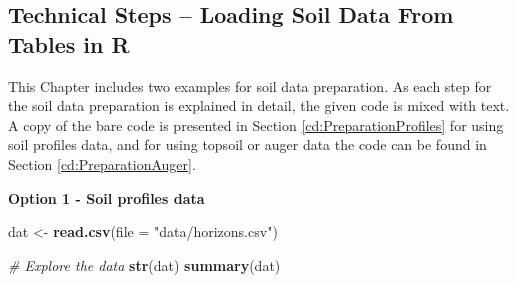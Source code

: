 \documentclass[10pt,b5paper,]{book}
\newenvironment{Shaded}{\begin{snugshade}}{\end{snugshade}}
\newcommand{\CommentTok}[1]{\textcolor[rgb]{0.56,0.35,0.01}{\textit{#1}}}
\newcommand{\DataTypeTok}[1]{\textcolor[rgb]{0.13,0.29,0.53}{#1}}
\newcommand{\KeywordTok}[1]{\textcolor[rgb]{0.13,0.29,0.53}{\textbf{#1}}}
\newcommand{\NormalTok}[1]{#1}
\newcommand{\StringTok}[1]{\textcolor[rgb]{0.31,0.60,0.02}{#1}}
\theoremstyle{definition}
\theoremstyle{definition}
\theoremstyle{definition}
\theoremstyle{remark}
\begin{document}
\hypertarget{technical-steps-loading-soil-data-from-tables-in-r}{%
\subsection{Technical Steps -- Loading Soil Data From Tables in
R}\label{technical-steps-loading-soil-data-from-tables-in-r}}

This Chapter includes two examples for soil data preparation. As each
step for the soil data preparation is explained in detail, the given
code is mixed with text. A copy of the bare code is presented in Section
\ref{cd:PreparationProfiles} for using soil profiles data, and for using
topsoil or auger data the code can be found in Section
\ref{cd:PreparationAuger}.

\textbf{Option 1 - Soil profiles data}

\begin{Shaded}
\begin{Highlighting}[]
\NormalTok{dat <-}\StringTok{ }\KeywordTok{read.csv}\NormalTok{(}\DataTypeTok{file =} \StringTok{"data/horizons.csv"}\NormalTok{)}

\CommentTok{# Explore the data}
\KeywordTok{str}\NormalTok{(dat)}
\KeywordTok{summary}\NormalTok{(dat)}
\end{Highlighting}
\end{Shaded}
\end{document}
